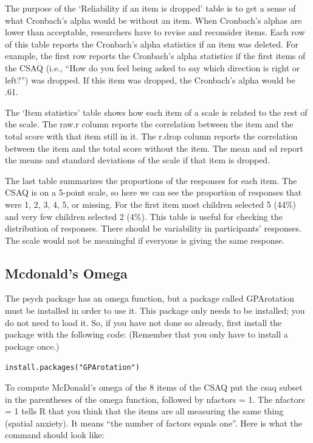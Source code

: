 \documentclass[
]{book}
\begin{document}
The purpose of the `Reliability if an item is dropped' table is to get a sense of what Cronbach's alpha would be without an item. When Cronbach's alphas are lower than acceptable, researchers have to revise and reconsider items. Each row of this table reports the Cronbach's alpha statistics if an item was deleted. For example, the first row reports the Cronbach's alpha statistics if the first items of the CSAQ (i.e., ``How do you feel being asked to say which direction is right or left?'') was dropped. If this item was dropped, the Cronbach's alpha would be .61.

The `Item statistics' table shows how each item of a scale is related to the rest of the scale. The raw.r column reports the correlation between the item and the total score with that item still in it. The r.drop column reports the correlation between the item and the total score without the item. The mean and sd report the means and standard deviations of the scale if that item is dropped.

The last table summarizes the proportions of the responses for each item. The CSAQ is on a 5-point scale, so here we can see the proportion of responses that were 1, 2, 3, 4, 5, or missing. For the first item most children selected 5 (44\%) and very few children selected 2 (4\%). This table is useful for checking the distribution of responses. There should be variability in participants' responses. The scale would not be meaningful if everyone is giving the same response.

\hypertarget{mcdonalds-omega}{%
\subsection{Mcdonald's Omega}\label{mcdonalds-omega}}

The psych package has an omega function, but a package called GPArotation must be installed in order to use it. This package only needs to be installed; you do not need to load it. So, if you have not done so already, first install the package with the following code: (Remember that you only have to install a package once.)

\texttt{install.packages("GPArotation")}

To compute McDonald's omega of the 8 items of the CSAQ put the csaq subset in the parentheses of the omega function, followed by nfactors = 1. The nfactors = 1 tells R that you think that the items are all measuring the same thing (spatial anxiety). It means ``the number of factors equals one''. Here is what the command should look like:
\end{document}
